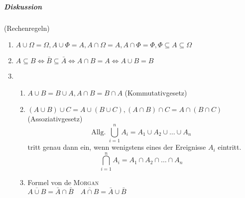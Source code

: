 \documentclass[a4paper]{scrartcl}
\begin{document}
\subparagraph{Diskussion} (Rechenregeln)
\begin{enumerate}
\item $A \cup \Omega = \Omega, A \cup \Phi = A, A \cap \Omega = A, A \cap \Phi = \Phi, \Phi \subseteq A \subseteq \Omega$
\item $A \subseteq B \Leftrightarrow \bar{B} \subseteq \bar{A}  \Leftrightarrow A \cap B = A \Leftrightarrow A \cup B = B$
\item 
\begin{enumerate}
\item $A \cup B = B \cup A, A \cap B = B \cap A$ (Kommutativgesetz)
\item $(A \cup B) \cup C = A \cup (B \cup C), (A \cap B) \cap C = A \cap (B \cap C)$ (Assoziativgesetz)
\[ \text{Allg. } \bigcup_{i=1}^n A_i = A_1 \cup A_2 \cup \dots \cup A_n\] tritt genau dann ein, wenn wenigstens eines der Ereignisse $A_i$ eintritt.
\[ \bigcap_{i=1}^n A_i = A_1 \cap A_2 \cap \dots \cap A_n\]
\item Formel von de \textsc{Morgan}\\
$\overline{A \cup B} = \bar{A} \cap \bar{B} \quad \overline{A \cap B} = \bar{A} \cup \bar{B}$
\end{enumerate}
\end{enumerate}
\end{document}
